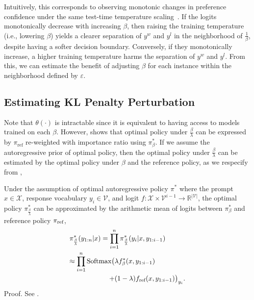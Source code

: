 Intuitively, this corresponds to observing monotonic changes in preference confidence under the same test-time temperature scaling~\cite{guo2017calibration}. If the logits monotonically decrease with increasing $\beta$, then raising the training temperature (i.e., lowering $\beta$) yields a clearer separation of $y^w$ and $y^l$ in the neighborhood of $\tfrac{1}{\beta}$, despite having a softer decision boundary. Conversely, if they monotonically increase, a higher training temperature harms the separation of $y^w$ and $y^l$. From this, we can estimate the benefit of adjusting $\beta$ for each instance within the neighborhood defined by $\varepsilon$.

\subsection{Estimating KL Penalty Perturbation}
Note that $\theta(\cdot)$ is intractable since it is equivalent to having access to models trained on each $\beta$. However, \citet{liu2024decoding} shows that optimal policy under $\frac{\beta}{\lambda}$ can be expressed by $\pi_\text{ref}$ re-weighted with importance ratio using $\pi^*_\beta$. If we assume the autoregressive prior of optimal policy, then the optimal policy under $\frac{\beta}{\lambda}$ can be estimated by the optimal policy under $\beta$ and the reference policy, as we respecify  from \citet{liu2024decoding},
\begin{proposition}\label{prop:dera}
Under the assumption of optimal autoregressive policy $\pi^*$ where the prompt $x \in \mathcal{X}$, response vocabulary $y_i \in \mathcal{V}$, and logit $f: \mathcal{X} \times \mathcal{V}^{i-1} \rightarrow \mathbb{R}^{|\mathcal{V}|}$, the optimal policy $\pi^*_\frac{\beta}{\lambda}$ can be approximated by the arithmetic mean of logits between $\pi^*_\beta$ and reference policy $\pi_{\textnormal{ref}}$,
\begin{equation*}
\begin{split}
&\pi^*_{\frac{\beta}{\lambda}} (y_{1:n}|x) = \prod_{i=1}^n \pi^*_{\frac{\beta}{\lambda}} (y_i|x, y_{1:i-1}) \\
&\begin{split}
    \approx \prod_{i=1}^n \textnormal{Softmax} \big( &\lambda f^*_\beta (x, y_{1:i-1}) \\
    + &(1 - \lambda) f_{\textnormal{ref}} (x, y_{1:i-1}) \big)_{y_i}. \\
\end{split}
\end{split}
\end{equation*}
Proof. See .
\end{proposition}

